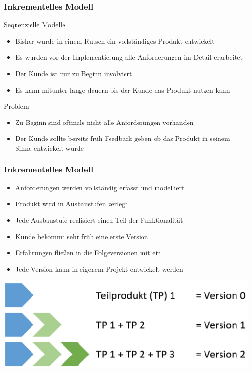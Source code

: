 \begin{frame}
\frametitle{Inkrementelles Modell}
	Sequenzielle Modelle
	\begin{itemize}
		\item Bisher wurde in einem Rutsch ein vollständiges Produkt entwickelt
		\item Es wurden vor der Implementierung alle Anforderungen im Detail erarbeitet
		\item Der Kunde ist nur zu Beginn involviert
		\item Es kann mitunter lange dauern bis der Kunde das Produkt nutzen kann
	\end{itemize}
	\bigskip
	Problem
	\begin{itemize}
		\item Zu Beginn sind oftmals nicht alle Anforderungen vorhanden
		\item Der Kunde sollte bereits früh Feedback geben ob das Produkt in seinem
		Sinne entwickelt wurde
	\end{itemize}
\end{frame}

\begin{frame}
\frametitle{Inkrementelles Modell}
	\begin{itemize}
		\item Anforderungen werden vollständig erfasst und modelliert
		\item Produkt wird in Ausbaustufen zerlegt
		\item Jede Ausbaustufe realisiert einen Teil der Funktionalität
		\item Kunde bekommt sehr früh eine erste Version
		\item Erfahrungen fließen in die Folgeversionen mit ein
		\item Jede Version kann in eigenem Projekt entwickelt werden
	\end{itemize}
	\center\includegraphics[width=1\textwidth,
		keepaspectratio=true]{bilder/inkrementelles_model.png}
\end{frame}


